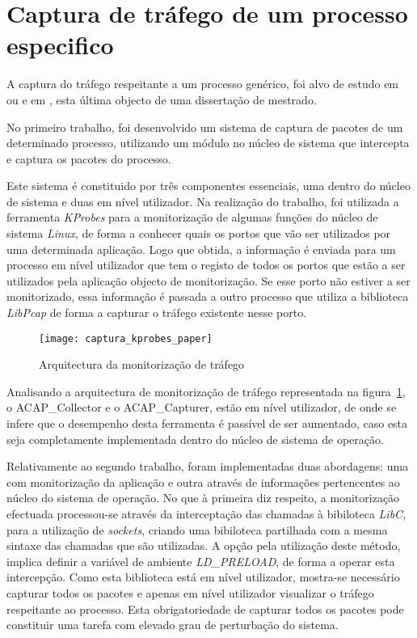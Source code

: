 \section{Captura de tráfego de um processo especifico}
\label{sect:outras_abordagens}

A captura do tráfego respeitante a um processo genérico, foi alvo de estudo em \cite{1688981} ou e em \cite{Farruca:2009}, esta última objecto de uma dissertação de mestrado.

No primeiro trabalho, foi desenvolvido um sistema de captura de pacotes de um determinado processo, utilizando um módulo no núcleo de sistema que intercepta e captura os pacotes do processo.

Este sistema é constituido por três componentes essenciais, uma dentro do núcleo de sistema e duas em nível utilizador.
Na realização do trabalho, foi utilizada a ferramenta \textit{KProbes} para a monitorização de algumas funções do núcleo de sistema \textit{Linux}, de forma a conhecer quais os portos que vão ser utilizados por uma determinada aplicação.
Logo que obtida, a informação é enviada para um processo em nível utilizador que tem o registo de todos os portos que estão a ser utilizados pela aplicação objecto de monitorização.
Se esse porto não estiver a ser monitorizado, essa informação é passada a outro processo que utiliza a biblioteca \textit{LibPcap} de forma a capturar o tráfego existente nesse porto.


\begin{figure}[h!]
       \centering
       \texttt{[image: captura\_kprobes\_paper]}
       \caption{Arquitectura da monitorização de tráfego}
	\label{fig:paper_capture_kprobes}
\end{figure}


Analisando a arquitectura de monitorização de tráfego representada na figura~\ref{fig:paper_capture_kprobes}, o ACAP\_Collector e o ACAP\_Capturer, estão em nível utilizador, de onde se infere que o desempenho desta ferramenta é passível de ser aumentado, caso esta seja completamente implementada dentro do núcleo de sistema de operação.

Relativamente ao segundo trabalho, foram implementadas duas abordagens: uma com monitorização da aplicação e outra através de informações pertencentes ao núcleo do sistema de operação.
No que à primeira diz respeito, a monitorização efectuada processou-se através da interceptação das chamadas à bibiloteca \textit{LibC}, para a utilização de \textit{sockets}, criando uma bibiloteca partilhada com a mesma sintaxe das chamadas que são utilizadas.
A opção pela utilização deste método, implica definir a variável de ambiente \textit{LD\_PRELOAD}, de forma a operar esta intercepção.
Como esta biblioteca está em nível utilizador, mostra-se necessário capturar todos os pacotes e apenas em nível utilizador visualizar o tráfego respeitante ao processo.
Esta obrigatoriedade de capturar todos os pacotes pode constituir uma tarefa com elevado grau de perturbação do sistema.

